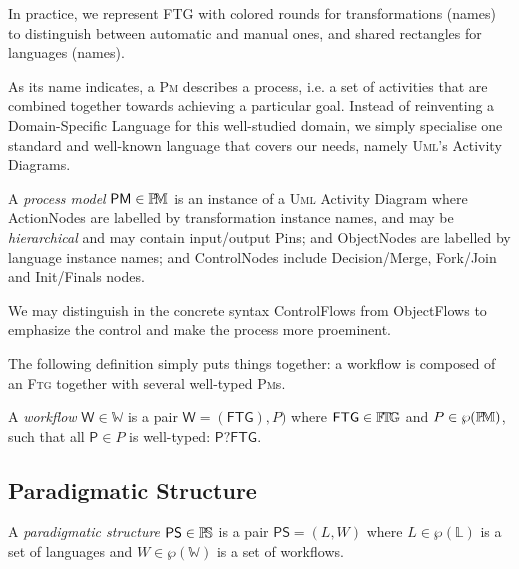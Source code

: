 In practice, we represent \textsf{FTG} with colored rounds for transformations 
(names) to distinguish between automatic and manual ones, and shared rectangles 
for languages (names).

\medskip
As its name indicates, a \textsc{Pm} describes a process, i.e. a set of 
activities that are combined together towards achieving a particular goal. 
Instead of reinventing a Domain-Specific Language for this well-studied domain, 
we simply specialise one standard and well-known language that covers our 
needs, namely \textsc{Uml}'s Activity Diagrams.

\begin{Definition}
   A \emph{process model} $\mathsf{PM}\in\mathbb{P}\!\mathbb{M}$ is an instance of a 
\textsc{Uml} Activity Diagram where \textsf{ActionNode}s are labelled by 
transformation instance names, and may be \emph{hierarchical} and may contain 
input/output \textsf{Pins}; and \textsf{ObjectNode}s are labelled by language 
instance names; and \textsf{ControlNode}s include 
\textsf{Decision}/\textsf{Merge}, \textsf{Fork}/\textsf{Join} and 
\textsf{Init}/\textsf{Finals} nodes.
\end{Definition}
We may distinguish in the concrete syntax \textsf{ControlFlow}s from 
\textsf{ObjectFlow}s to emphasize the control and make the process more 
proeminent.  

\medskip
{}


\medskip
The following definition simply puts things together: a workflow is composed of 
an \textsc{Ftg} together with several well-typed \textsc{Pm}s. 

\begin{Definition}[Workflow]
   A \emph{workflow} $\mathsf{W}\in\mathbb{W}$ is a pair $\mathsf{W} = 
(\mathsf{FTG}), P)$ where $\mathsf{FTG}\in\mathbb{F}\!\mathbb{T}\!\mathbb{G}$ and $P\in\wp(\mathbb{P}\!\mathbb{M})$, such that 
all $\mathsf{P}\in P$ is well-typed: $\mathsf{P} ? \mathsf{FTG}$.
\end{Definition}



\subsection{Paradigmatic Structure}
\label{sec:PS}

\begin{Definition}
   A \emph{paradigmatic structure} $\mathsf{PS}\in \mathbb{P}\!\mathbb{S}$ is a pair $\mathsf{PS} 
= (L, W)$ where $L\in \wp(\mathbb{L})$ is a set of languages and 
$W \in \wp(\mathbb{W})$ is a set of workflows.
\end{Definition}

